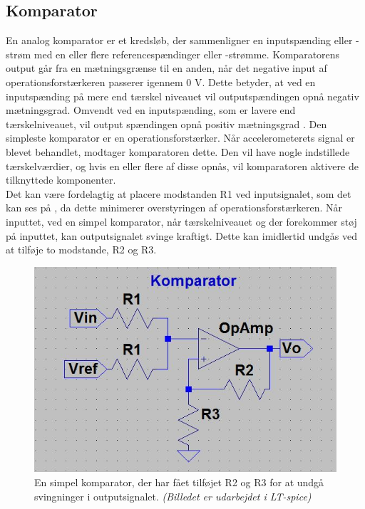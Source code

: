 \subsection{Komparator}
En analog komparator er et kredsløb, der sammenligner en inputspænding eller -strøm med en eller flere referencespændinger eller -strømme. Komparatorens output går fra en mætningsgrænse til en anden, når det negative input af operationsforstærkeren passerer igennem 0 V. Dette betyder, at ved en inputspænding på mere end tærskel niveauet vil outputspændingen opnå negativ mætningsgrad. Omvendt ved en inputspænding, som er lavere end tærskelniveauet, vil output spændingen opnå positiv mætningsgrad .  Den simpleste komparator er en operationsforstærker. \cite{webster2009} Når accelerometerets signal er blevet behandlet, modtager komparatoren dette. Den vil have nogle indstillede tærskelværdier, og hvis en eller flere af disse opnås, vil komparatoren aktivere de tilknyttede komponenter. \\
Det kan være fordelagtig at placere modstanden R1 ved inputsignalet, som det kan ses på , da dette minimerer overstyringen af operationsforstærkeren.  Når inputtet, ved en simpel komparator, når tærskelniveauet og der forekommer støj på inputtet, kan outputsignalet svinge kraftigt. Dette kan imidlertid undgås ved at tilføje to modstande, R2 og R3. \cite{webster2009}
\begin{figure}[H]
\centering
\includegraphics[scale=0.6]{figures/cProblemloesning/Komparator.JPG}
\caption{En simpel komparator, der har fået tilføjet R2 og R3 for at undgå svingninger i outputsignalet. \textit{(Billedet er udarbejdet i LT-spice)}}
\label{komparator}
\end{figure}
